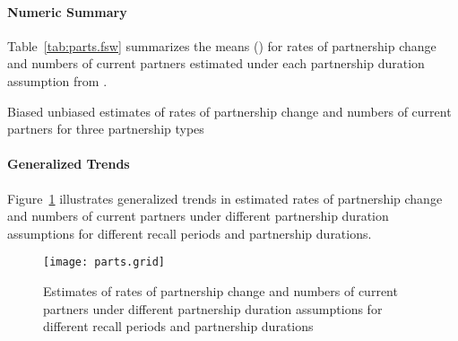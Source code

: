 \paragraph{Numeric Summary}
Table~\ref{tab:parts.fsw} summarizes the means (\ci) for
rates of partnership change and numbers of current partners
estimated under each partnership duration assumption from .
\begin{table}[h]
  \centering
  \caption{Biased \vs unbiased estimates of
    rates of partnership change and numbers of current partners
    for three partnership types}
  \label{tab:parts.fsw}
  
\end{table}
\paragraph{Generalized Trends}
Figure~\ref{fig:parts.grid} illustrates generalized trends in estimated
rates of partnership change and numbers of current partners
under different partnership duration assumptions
for different recall periods and partnership durations.
\begin{figure}[h]
  \centering\texttt{[image: parts.grid]}
  \caption{Estimates of rates of partnership change and numbers of current partners
    under different partnership duration assumptions
    for different recall periods and partnership durations}
  \label{fig:parts.grid}
\end{figure}
\printbibliography
